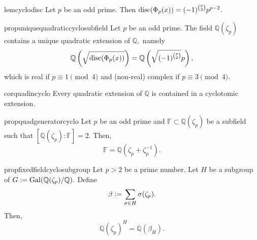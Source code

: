 \begin{restatable}[]{lem}{cyclodisc}
\label{lem:cyclodisc}
    Let $p$ be an odd prime. Then $\operatorname{disc}(\Phi_p(x)) = (-1)^{\binom{p}{2}}p^{p - 2}.$ \hfill\hyperref[lem:cyclodisc2]{\downsym}
\end{restatable}

\begin{restatable}[]{prop}{uniquequadraticcyclosubfield}
\label{prop:uniquequadraticcyclosubfield}
    Let $p$ be an odd prime. The field $\mathbb{Q}(\zeta_p)$ contains a unique quadratic extension of $\mathbb{Q},$ namely
    \begin{equation*} 
        \mathbb{Q}\left(\sqrt{\operatorname{disc}(\Phi_p(x))}\right) = \mathbb{Q}\left(\sqrt{(-1)^{\binom{p}{2}}}p\right),
    \end{equation*}
    which is real if $p \equiv 1 \pmod{4}$ and (non-real) complex if $p \equiv 3 \pmod{4}.$ \hfill\hyperref[prop:uniquequadraticcyclosubfield2]{\downsym}
\end{restatable}

\begin{restatable}[]{cor}{quadincyclo}
\label{cor:quadincyclo}
    Every quadratic extension of $\mathbb{Q}$ is contained in a cyclotomic extension. \hfill\hyperref[cor:quadincyclo2]{\downsym}
\end{restatable}

\begin{restatable}[]{prop}{quadgeneratorcyclo}
\label{prop:quadgeneratorcyclo}
    Let $p$ be an odd prime and $\mathbb{F} \subset \mathbb{Q}(\zeta_p)$ be a subfield such that $[\mathbb{Q}(\zeta_p) : \mathbb{F}] = 2.$ Then,
    \begin{equation*} 
        \mathbb{F} = \mathbb{Q}(\zeta_p + \zeta_p^{-1}).
    \end{equation*} \hfill\hyperref[prop:quadgeneratorcyclo2]{\downsym}
\end{restatable}

\begin{restatable}[]{prop}{fixedfieldcyclosubgroup}
\label{prop:fixedfieldcyclosubgroup}
    Let $p > 2$ be a prime number. Let $H$ be a subgroup of $G \vcentcolon= \operatorname{Gal}(\mathbb{Q}(\zeta_p)/\mathbb{Q}).$ Define
    \begin{equation*} 
        \beta \vcentcolon= \sum_{\sigma \in H} \sigma(\zeta_p).
    \end{equation*}
    Then,
    \begin{equation*} 
        \mathbb{Q}(\zeta_p)^H = \mathbb{Q}(\beta_H).
    \end{equation*} 
    \hfill\hyperref[prop:fixedfieldcyclosubgroup2]{\downsym}
\end{restatable}

